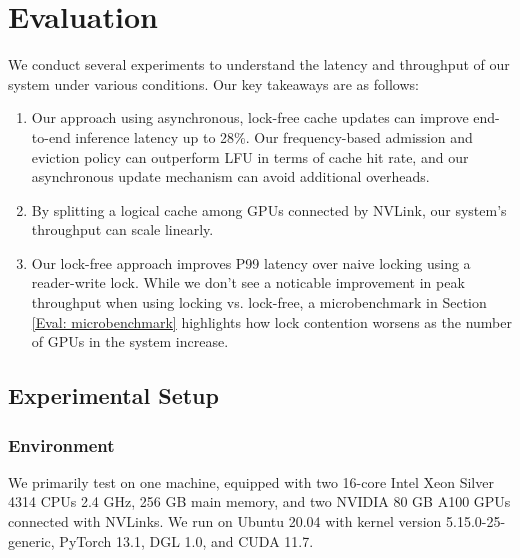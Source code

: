 \chapter{Evaluation} \label{Evaluation}
We conduct several experiments to understand the latency and throughput of our system under various conditions. Our key takeaways are as follows:

\begin{enumerate}
    \item Our approach using asynchronous, lock-free cache updates can improve end-to-end inference latency up to 28\%. Our frequency-based admission and eviction policy can outperform LFU in terms of cache hit rate, and our asynchronous update mechanism can avoid additional overheads.
    \item By splitting a logical cache among GPUs connected by NVLink, our system's throughput can scale linearly. 
    \item Our lock-free approach improves P99 latency over naive locking using a reader-write lock. While we don't see a noticable improvement in peak throughput when using locking vs. lock-free, a microbenchmark in Section \ref{Eval: microbenchmark} highlights how lock contention worsens as the number of GPUs in the system increase.
\end{enumerate}

\section{Experimental Setup}
\subsection{Environment} \label{Eval: Test hardware}
We primarily test on one machine, equipped with two 16-core Intel Xeon Silver 4314 CPUs \@ 2.4 GHz, 256 GB main memory, and two NVIDIA 80 GB A100 GPUs connected with NVLinks. We run on Ubuntu 20.04 with kernel version 5.15.0-25-generic, PyTorch 13.1, DGL 1.0, and CUDA 11.7.

